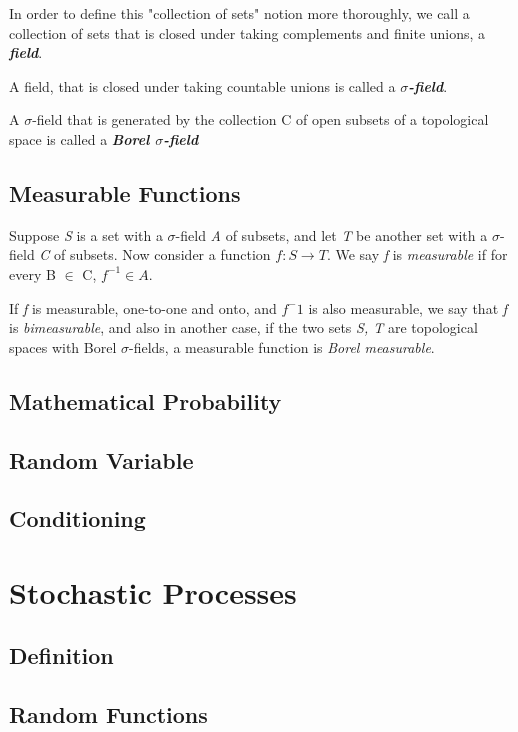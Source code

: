 \documentclass{article}
\begin{document}
In order to define this "collection of sets" notion more thoroughly, we call a collection of sets that is closed under taking complements and finite unions, a \textbf{\textit{field}}.

A field, that is closed under taking countable unions is called a \textbf{\textit{$\sigma$-field}}.

A $\sigma$-field that is generated by the collection C of open subsets of a topological space is called a \textbf{\textit{Borel $\sigma$-field}}
\subsection{Measurable Functions}

Suppose \textit{S} is a set with a $\sigma$-field \textit{A} of subsets, and let \textit{T} be another set with a $\sigma$-field \textit{C} of subsets. Now consider a function $f : S \rightarrow T$. We say \textit{f} is \textit{measurable} if for every B $\in$ C, $f^{-1} \in A$.

If \textit{f} is measurable, one-to-one and onto, and $f^-1$ is also measurable, we say that \textit{f} is \textit{bimeasurable}, and also in another case, if the two sets \textit{S, T} are topological spaces with Borel $\sigma$-fields, a measurable function is \textit{Borel measurable}.


\subsection{Mathematical Probability}

\subsection{Random Variable}

\subsection{Conditioning}

\section{Stochastic Processes}

\subsection{Definition}

\subsection{Random Functions}
\end{document}
